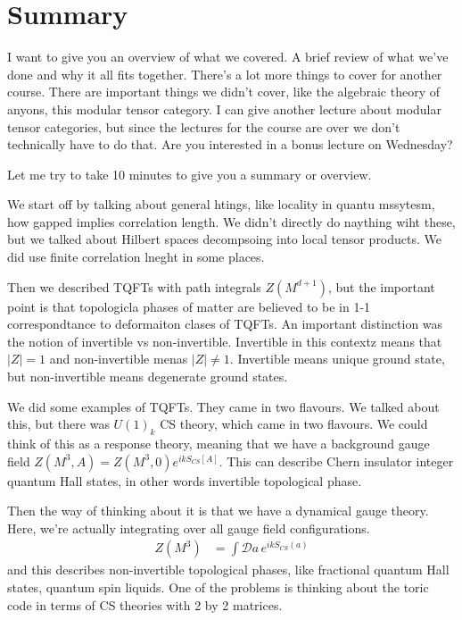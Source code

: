 \section{Summary}
I want to give you an overview of what we covered.
A brief review of what we've done and why it all fits together.
There's a lot more things to cover for another course.
There are important things we didn't cover,
like the algebraic theory of anyons,
this modular tensor category.
I can give another lecture about modular tensor categories,
but since the lectures for the course are over we don't technically have to do
that.
Are you interested in a bonus lecture on Wednesday?

Let me try to take 10 minutes to give you a summary or overview.

We start off by talking about general htings,
like locality in quantu mssytesm,
how gapped implies correlation length.
We didn't directly do naything wiht these,
but we talked about Hilbert spaces decompsoing into local tensor products.
We did use finite correlation lneght in some places.

Then we described TQFTs with path integrals $Z\left( M^{d+1} \right)$,
but the important point is that topologicla phases of matter are believed to be
in 1-1 correspondtance to deformaiton clases of TQFTs.
An important distinction was the notion of invertible vs non-invertible.
Invertible in this contextz means that $|Z|=1$ 
and non-invertible menas $|Z|\ne 1$.
Invertible means unique ground state,
but non-invertible means degenerate ground states.

We did some examples of TQFTs.
They came in two flavours.
We talked about this,
but there was $U(1)_k$ CS theory,
which came in two flavours.
We could think of this as a response theory,
meaning that we have a background gauge field
$Z\left( M^3, A \right) = Z\left( M^3, 0 \right) e^{i k S_{CS}[A]}$.
This can describe Chern insulator integer quantum Hall states,
in other words invertible topological phase.

Then the way of thinking about it is that we have a dynamical gauge theory.
Here,
we're actually integrating over all gauge field configurations.
\begin{align}
    Z\left( M^3 \right) &=
    \int \mathcal{D} a\,
    e^{ikS_{CS}(a)}
\end{align}
and this describes non-invertible topological phases,
like fractional quantum Hall states,
quantum spin liquids.
One of the problems is thinking about the toric code in terms of CS theories
with 2 by 2 matrices.

